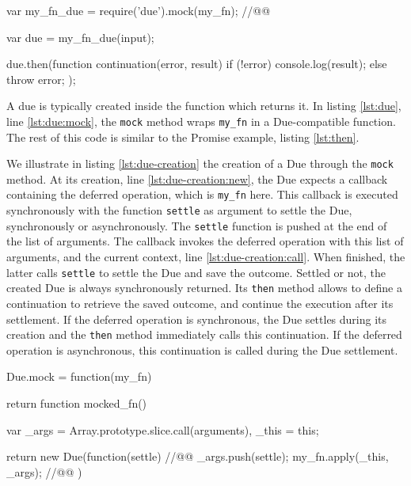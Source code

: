 \begin{code}[js, %
             caption={Example of a due}, %
             label={lst:due}] %
var my_fn_due = require('due').mock(my_fn); //@\label{lst:due:mock}@

var due = my_fn_due(input);

due.then(function continuation(error, result) {
  if (!error) {
    console.log(result);
  } else {
    throw error;
  }
});
\end{code}

A due is typically created inside the function which returns it.
In listing \ref{lst:due}, line \ref{lst:due:mock}, the \texttt{mock} method wraps \texttt{my\_fn} in a Due-compatible function.
The rest of this code is similar to the Promise example, listing \ref{lst:then}.

We illustrate in listing \ref{lst:due-creation} the creation of a Due through the \texttt{mock} method.
At its creation, line \ref{lst:due-creation:new}, the Due expects a callback containing the deferred operation, which is \texttt{my\_fn} here.
This callback is executed synchronously with the function \texttt{settle} as argument to settle the Due, synchronously or asynchronously.
The \texttt{settle} function is pushed at the end of the list of arguments.
The callback invokes the deferred operation with this list of arguments, and the current context, line \ref{lst:due-creation:call}.
When finished, the latter calls \texttt{settle} to settle the Due and save the outcome.
Settled or not, the created Due is always synchronously returned.
Its \texttt{then} method allows to define a continuation to retrieve the saved outcome, and continue the execution after its settlement.
If the deferred operation is synchronous, the Due settles during its creation and the \texttt{then} method immediately calls this continuation.
If the deferred operation is asynchronous, this continuation is called during the Due settlement.


\begin{code}[js, %
             caption={Creation of a due}, %
             label={lst:due-creation}] %
Due.mock = function(my_fn) {
  return function mocked_fn() {
    var _args = Array.prototype.slice.call(arguments),
        _this = this;

    return new Due(function(settle) {  //@\label{lst:due-creation:new}@
      _args.push(settle);
      my_fn.apply(_this, _args); //@\label{lst:due-creation:call}@
    })
  }
}
\end{code}

